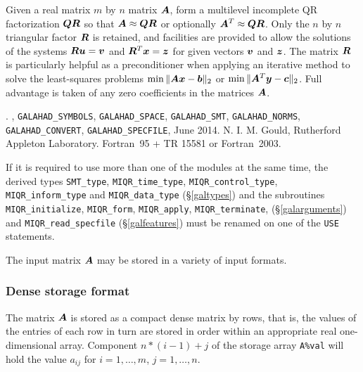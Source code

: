 \documentclass{galahad}
\newcommand{\packagename}{MIQR}
\newcommand{\fullpackagename}{\libraryname\_\packagename}
\begin{document}
\galheader


\galsummary
Given a real matrix $m$ by $n$ matrix ${\bm{A}}$, form a multilevel 
incomplete QR factorization ${\bm{Q}} {\bm{R}}$ so that ${\bm{A}} \approx {\bm{Q}}{\bm{R}}$ or
optionally ${\bm{A}}^T \approx {\bm{Q}}{\bm{R}}$.
Only the $n$ by $n$ triangular factor ${\bm{R}}$ is retained, and facilities
are provided to allow the solutions of the systems ${\bm{R}} {\bm{u}} = {\bm{v}}$ and 
${\bm{R}}^T {\bm{x}} = {\bm{z}}$
for given vectors ${\bm{v}}$ and ${\bm{z}}$. The matrix ${\bm{R}}$ is particularly helpful
as a preconditioner when applying an iterative method to solve the
least-squares problems $\min \|{\bm{A}}{\bm{x}}-{\bm{b}}\|_2$ or 
$\min \|{\bm{A}}^T{\bm{y}}-{\bm{c}}\|_2$.
Full advantage is taken of any zero coefficients in the matrices ${\bm{A}}$.


\galattributes
\galversions{\tt  \fullpackagename\_single, \fullpackagename\_double}.
,
{\tt GALAHAD\_\-SY\-M\-BOLS}, 
{\tt GALAHAD\-\_SPACE}, 
{\tt GALAHAD\_SMT},
{\tt GALAHAD\_NORMS},
{\tt GALAHAD\_CONVERT},
{\tt GALAHAD\_SPECFILE},
\galdate June 2014.
\galorigin N. I. M. Gould,
Rutherford Appleton Laboratory.
\gallanguage Fortran~95 + TR 15581 or Fortran~2003. 


\galhowto



\noindent
If it is required to use more than one of the modules at the same time, 
the derived types
{\tt SMT\_type}, 
{\tt \packagename\_time\_type}, 
{\tt \packagename\_control\_type}, 
{\tt \packagename\_inform\_type} 
and
{\tt \packagename\_data\_type}
(\S\ref{galtypes})
and the subroutines
{\tt \packagename\_initialize}, 
{\tt \packagename\_\-form},
{\tt \packagename\_\-apply},
{\tt \packagename\_terminate},
(\S\ref{galarguments})
and 
{\tt \packagename\_read\_specfile}
(\S\ref{galfeatures})
must be renamed on one of the {\tt USE} statements.


\galmatrix
The input matrix ${\bm{A}}$ may be stored in a variety of input formats.

\subsubsection{Dense storage format}\label{dense}
The matrix ${\bm{A}}$ is stored as a compact 
dense matrix by rows, that is, the values of the entries of each row in turn are
stored in order within an appropriate real one-dimensional array.
Component $n \ast (i-1) + j$ of the storage array {\tt A\%val} will hold the 
value $a_{ij}$ for $i = 1, \ldots , m$, $j = 1, \ldots , n$.
\end{document}
